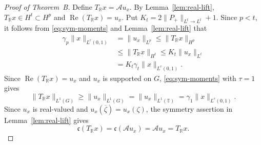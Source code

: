 \documentclass[11pt, reqno]{amsart}
\theoremstyle{definition}
\theoremstyle{remark}
\newcommand{\T}{\mathbb{T}}
\newcommand{\R}{\mathbb{R}}
\begin{document}
\begin{proof}[Proof of Theorem~B]
Define \(T_{\R}x=\mathcal Au_x\). By
Lemma~\ref{lem:real-lift},
\(T_{\R}x\in H^t\subset H^p\) and
\(\operatorname{Re}(T_{\R}x)=u_x\). Put \(K_t=2\|P_+\|_{L^t\to L^t}+1\).  Since \(p<t\), it follows from
\eqref{eq:sym-moments} and
Lemma~\ref{lem:real-lift} that
\begin{equation}
\label{eq:real-Hp}
\begin{aligned}
        \gamma_p\|x\|_{L^r(0,1)}
        &=
        \|u_x\|_{L^p}
        \le
        \|T_{\R}x\|_{H^p}\\
        &\le
        \|T_{\R}x\|_{H^t}
        \le
        K_t\|u_x\|_{L^t}\\
        &=
        K_t\gamma_t\|x\|_{L^r(0,1)}.
\end{aligned}
\end{equation}
Since \(\operatorname{Re}(T_{\R}x)=u_x\) and \(u_x\) is supported
on \(G\), \eqref{eq:sym-moments} with \(\tau=1\) gives
\begin{equation}
\label{eq:real-local}
        \|T_{\R}x\|_{L^1(G)}
        \ge
        \|u_x\|_{L^1(G)}
        =
        \|u_x\|_{L^1(\T)}
        =
        \gamma_1\|x\|_{L^r(0,1)}.
\end{equation}
Since \(u_x\) is real-valued and
\(u_x(\overline\zeta)=u_x(\zeta)\), the symmetry assertion in
Lemma~\ref{lem:real-lift} gives
\begin{equation}
\label{eq:conj-invariance}
        \mathfrak c(T_{\R}x)
        =
        \mathfrak c(\mathcal Au_x)
        =
        \mathcal Au_x
        =
        T_{\R}x.
\end{equation}


\end{proof}
\end{document}
